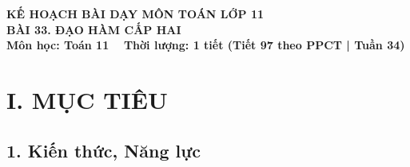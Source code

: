\documentclass[12pt, a4paper]{article}
\begin{document}
\begin{center}
    {\fontsize{14pt}{17pt}\selectfont \textbf{KẾ HOẠCH BÀI DẠY MÔN TOÁN LỚP 11}}\\[6pt]
    {\fontsize{16pt}{19pt}\selectfont \textbf{BÀI 33. ĐẠO HÀM CẤP HAI}}\\[4pt]
    {\fontsize{12pt}{15pt}\selectfont \textbf{Môn học: Toán 11} \ \textbar \ \textbf{Thời lượng: 1 tiết (Tiết 97 theo PPCT | Tuần 34)}}
\end{center}

\vspace{5pt}

\section*{I. MỤC TIÊU}

\subsection*{1. Kiến thức, Năng lực}
\end{document}
